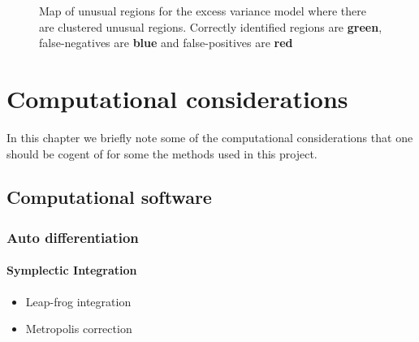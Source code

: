 \documentclass[11pt]{report}
\begin{document}
\begin{figure}
\centering
{}
\label{fig:var}
\caption{Map of unusual regions for the excess variance model where there are clustered unusual regions. Correctly identified regions are {\color{Green} \bf green}, false-negatives are {\color{Blue}\bf blue} and false-positives are {\color{Red}\bf red}}
\end{figure}

\chapter{Computational considerations}

In this chapter we briefly note some of the computational considerations that one should be cogent of for some the methods used in this project.

\section{Computational software}

\subsection{Auto differentiation}

\subsubsection{Symplectic Integration}

\begin{itemize}
\item Leap-frog integration
\item Metropolis correction
\end{itemize}
\end{document}
